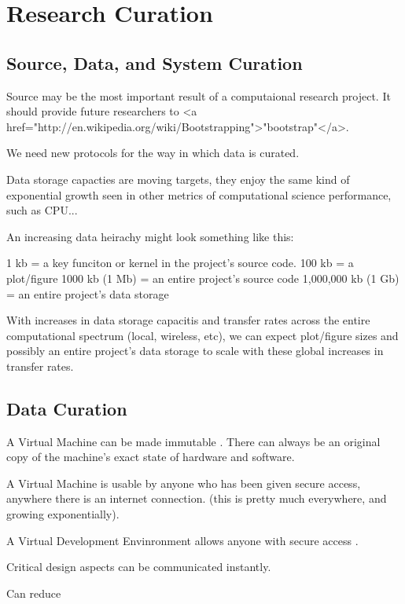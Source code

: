 \section{Research Curation}\label{}

\subsection{Source, Data, and System Curation}\label{}

Source may be the most important result of a computaional research project. It should provide 
future researchers to <a href="http://en.wikipedia.org/wiki/Bootstrapping">"bootstrap"</a>. 

We need new protocols for the way in which data is curated.

Data storage capacties are moving targets, they enjoy the same kind of exponential 
growth seen in other metrics of computational science performance, such as CPU...

An increasing data heirachy might look something like this:

1 kb = a key funciton or kernel in the project's source code.
100 kb = a plot/figure 
1000 kb (1 Mb) = an entire project's source code
1,000,000 kb (1 Gb) = an entire project's data storage

With increases in data storage capacitis and transfer rates across the 
entire computational spectrum (local, wireless, etc), 
we can expect plot/figure sizes and possibly an entire project's data storage to scale with 
these global increases in transfer rates. 



\subsection{Data Curation}\label{}


A Virtual Machine can be made immutable . There can always be an original copy 
of the machine's exact state of hardware and software.

A Virtual Machine is usable by anyone who has been given secure access, anywhere there 
is an internet connection. (this is pretty much everywhere, and growing exponentially).

A Virtual Development Envinronment allows anyone with secure access 
.

Critical design aspects can be communicated instantly.  

Can reduce 

